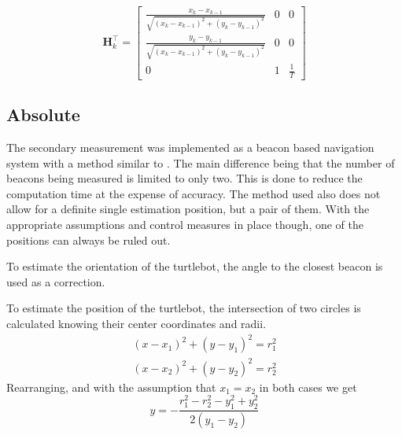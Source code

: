 	\begin{equation}
	\label{eq:Hsys}
		\boldsymbol{H}_{k}	^{\top}=
		\begin{bmatrix}
			\frac{x_{k}-x_{k-1}}{\sqrt{\left( x_{k} - x_{k-1} \right)^{2}+\left( y_{k} - y_{k-1} \right)^{2}}}	&0	&0		\\
			\frac{y_{k}-y_{k-1}}{\sqrt{\left( x_{k} - x_{k-1} \right)^{2}+\left( y_{k} - y_{k-1} \right)^{2}}}	&0	&0		\\
			0															&1	&\frac{1}{T}
			
		\end{bmatrix}
	\end{equation}

\subsection{Absolute}
	The secondary measurement was implemented as a beacon based navigation system with a method similar to \cite{beacon}. The main difference being that the number of beacons being measured is limited to only two. This is done to reduce the computation time at the expense of accuracy. The method used also does not allow for a definite single estimation position, but a pair of them. With the appropriate assumptions and control measures in place though, one of the positions can always be ruled out.\par
	To estimate the orientation of the turtlebot, the angle to the closest beacon is used as a correction.
	
	To estimate the position of the turtlebot, the intersection of two circles is calculated knowing their center coordinates and radii.
	\begin{equation}
	\begin{aligned}
		\left(x-x_{1}\right)^{2} + \left(y-y_{1}\right)^{2}=r_{1}^{2}	\\
		\left(x-x_{2}\right)^{2} + \left(y-y_{2}\right)^{2}=r_{2}^{2}
	\end{aligned}
	\end{equation}
	Rearranging, and with the assumption that $x_{1}=x_{2}$  in both cases we get
	\begin{equation}
		y = -\frac{r_{1}^{2}-r_{2}^{2}-y_{1}^{2}+y_{2}^{2}}{2\left(y_{1}-y_{2}\right)}
	\end{equation}
	
